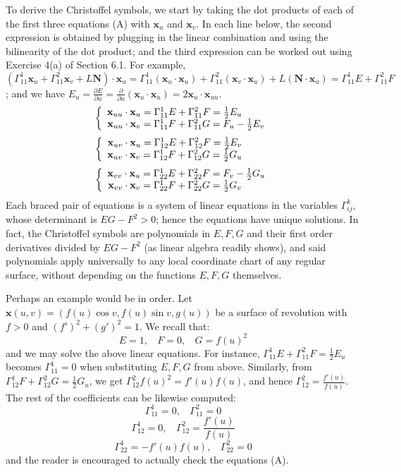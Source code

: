 \documentclass[leqno]{book}
\begin{document}
To derive the Christoffel symbols, we start by taking the dot products of each of the first three equations (A) with $\mathbf x_u$ and $\mathbf x_v$.  In each line below, the second expression is obtained by plugging in the linear combination and using the bilinearity of the dot product; and the third expression can be worked out using Exercise 4(a) of Section 6.1.  For example, $(\Gamma_{11}^1\mathbf x_u+\Gamma_{11}^2\mathbf x_v+L\mathbf N)\cdot\mathbf x_u=\Gamma_{11}^1(\mathbf x_u\cdot\mathbf x_u)+\Gamma_{11}^2(\mathbf x_v\cdot\mathbf x_u)+L(\mathbf N\cdot\mathbf x_u)=\Gamma_{11}^1E+\Gamma_{11}^2F$; and we have $E_u=\frac{\partial E}{\partial u}=\frac{\partial}{\partial u}(\mathbf x_u\cdot\mathbf x_u)=2\mathbf x_u\cdot\mathbf x_{uu}$.
$$\left\{\begin{array}{c l}\mathbf x_{uu}\cdot\mathbf x_u=\Gamma_{11}^1E+\Gamma_{11}^2F=\frac 12E_u~~~~~~~\\\mathbf x_{uu}\cdot\mathbf x_v=\Gamma_{11}^1F+\Gamma_{11}^2G=F_u-\frac 12E_v\end{array}\right.$$
$$\left\{\begin{array}{c l}\mathbf x_{uv}\cdot\mathbf x_u=\Gamma_{12}^1E+\Gamma_{12}^2F=\frac 12E_v~~~~~~~\\\mathbf x_{uv}\cdot\mathbf x_v=\Gamma_{12}^1F+\Gamma_{12}^2G=\frac 12G_u~~~~~~~\end{array}\right.$$
$$\left\{\begin{array}{c l}\mathbf x_{vv}\cdot\mathbf x_u=\Gamma_{22}^1E+\Gamma_{22}^2F=F_v-\frac 12G_u\\\mathbf x_{vv}\cdot\mathbf x_v=\Gamma_{22}^1F+\Gamma_{22}^2G=\frac 12G_v~~~~~~~\end{array}\right.$$
Each braced pair of equations is a system of linear equations in the variables $\Gamma_{ij}^k$, whose determinant is $EG-F^2>0$; hence the equations have unique solutions.  In fact, the Christoffel symbols are polynomials in $E,F,G$ and their first order derivatives divided by $EG-F^2$ (as linear algebra readily shows), and said polynomials apply universally to any local coordinate chart of any regular surface, without depending on the functions $E,F,G$ themselves.

Perhaps an example would be in order.  Let $\mathbf x(u,v)=(f(u)\cos v,f(u)\sin v,g(u))$ be a surface of revolution with $f>0$ and $(f')^2+(g')^2=1$.  We recall that:
$$E=1,~~~~F=0,~~~~G=f(u)^2$$
and we may solve the above linear equations.  For instance, $\Gamma_{11}^1E+\Gamma_{11}^2F=\frac 12E_u$ becomes $\Gamma_{11}^1=0$ when substituting $E,F,G$ from above.  Similarly, from $\Gamma_{12}^1F+\Gamma_{12}^2G=\frac 12G_u$, we get $\Gamma_{12}^2f(u)^2=f'(u)f(u)$, and hence $\Gamma_{12}^2=\frac{f'(u)}{f(u)}$.  The rest of the coefficients can be likewise computed:
$$\Gamma_{11}^1=0,~~~~\Gamma_{11}^2=0$$
$$\Gamma_{12}^1=0,~~~~\Gamma_{12}^2=\frac{f'(u)}{f(u)}$$
$$\Gamma_{22}^1=-f'(u)f(u),~~~~\Gamma_{22}^2=0$$
and the reader is encouraged to actually check the equations (A).\\
\end{document}
